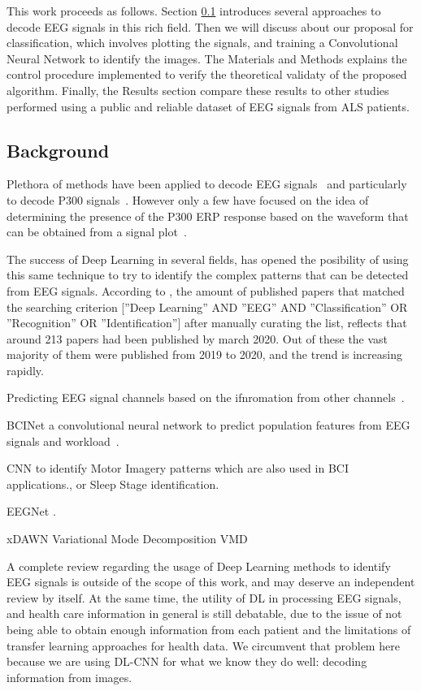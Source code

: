 \documentclass[conference]{IEEEtran}
\begin{document}
This work proceeds as follows.  Section \ref{background} introduces several approaches to decode EEG signals in this rich field.  Then we will discuss about our proposal for classification, which involves plotting the signals, and training a Convolutional Neural Network to identify the images.  The Materials and Methods explains the control procedure implemented to verify the theoretical validaty of the proposed algorithm. Finally, the Results section compare these results to other studies performed using a public and reliable dataset of EEG signals from ALS patients. 

\subsection{Background}
\label{background}

Plethora of methods have been applied to decode EEG signals~\cite{Orhanbulucu.etal2022,Avola.etal2022} and particularly to decode P300 signals~\cite{Jiannan.etal2021}.  However only a few have focused on the idea of determining the presence of the P300 ERP response based on the waveform that can be obtained from a signal plot~\cite{Ramele2018EEGWA}.

The success of Deep Learning in several fields\cite{Sarker.2021}, has opened the posibility of using this same technique to try to identify the complex patterns that can be detected from EEG signals.  According to \cite{dnn10years}, the amount of published papers that matched the searching criterion  [”Deep Learning” AND ”EEG” AND ”Classification” OR ”Recognition” OR ”Identification”] after manually curating the list, reflects that around 213 papers had been published by march 2020. Out of these the vast majority of them were published from 2019 to 2020, and the trend is increasing rapidly. 

Predicting EEG signal channels based on the ifnromation from other channels~\cite{Avijit.2020}.

BCINet a convolutional neural network to predict population features from EEG signals and workload~\cite{Singh.etal2020}.

CNN to identify Motor Imagery patterns which are also used in BCI applications.\cite{Tabar.2016}, or Sleep Stage identification\cite{Cai.etal2021}.

EEGNet \cite{Lawhern.2018}.

xDAWN
Variational Mode Decomposition VMD

A complete review regarding the usage of Deep Learning methods to identify EEG signals is outside of the scope of this work, and may deserve an independent review by itself.  At the same time, the utility of DL in processing EEG signals, and health care information in general is still debatable, due to the issue of not being able to obtain enough information from each patient and the limitations of transfer learning approaches for health data.  We circumvent that problem here because we are using DL-CNN for what we know they do well: decoding information from images.
\end{document}
